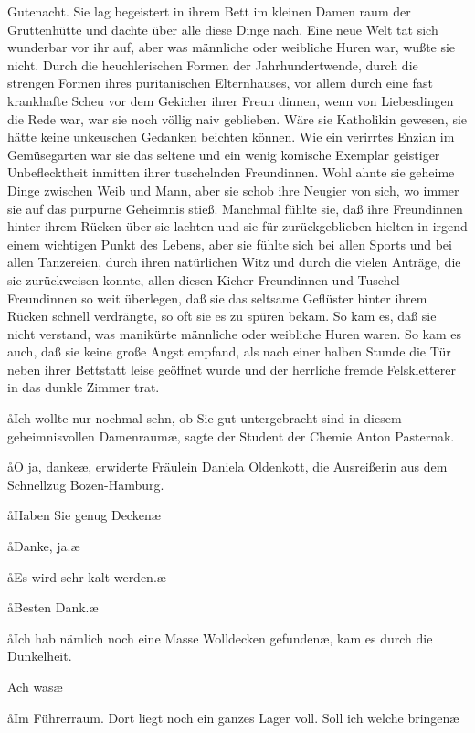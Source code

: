 Gutenacht. Sie lag begeistert in ihrem Bett im kleinen Damen\-%
raum der Gruttenhütte und dachte über alle diese Dinge nach.
Eine neue Welt tat sich wunderbar vor ihr auf, aber was
männliche oder weibliche Huren war, wußte sie nicht. Durch
die heuchlerischen Formen der Jahrhundertwende, durch die
strengen Formen ihres puritanischen Elternhauses, vor allem
durch eine fast krankhafte Scheu vor dem Gekicher ihrer Freun\-%
dinnen, wenn von Liebesdingen die Rede war, war sie noch
völlig naiv geblieben. Wäre sie Katholikin gewesen, sie hätte
keine unkeuschen Gedanken beichten können. Wie ein verirrtes
Enzian im Gemüsegarten war sie das seltene und ein wenig
komische Exemplar geistiger Unbeflecktheit inmitten ihrer
tuschelnden Freundinnen. Wohl ahnte sie geheime Dinge
zwischen Weib und Mann, aber sie schob ihre Neugier von sich,
wo immer sie auf das purpurne Geheimnis stieß. Manchmal
fühlte sie, daß ihre Freundinnen hinter ihrem Rücken über
sie lachten und sie für zurückgeblieben hielten in irgend einem
wichtigen Punkt des Lebens, aber sie fühlte sich bei allen
Sports und bei allen Tanzereien, durch ihren natürlichen
Witz und durch die vielen Anträge, die sie zurückweisen konnte,
allen diesen Kicher-Freundinnen und Tuschel-Freundinnen
so weit überlegen, daß sie das seltsame Geflüster hinter ihrem
Rücken schnell verdrängte, so oft sie es zu spüren bekam. So
kam es, daß sie nicht verstand, was manikürte männliche oder
weibliche Huren waren. So kam es auch, daß sie keine große
Angst empfand, als nach einer halben Stunde die Tür neben
ihrer Bettstatt leise geöffnet wurde und der herrliche fremde
Felskletterer in das dunkle Zimmer trat.

\aa{}Ich wollte nur nochmal sehn, ob Sie gut untergebracht sind
in diesem geheimnisvollen Damenraum\ae{}, sagte der Student
der Chemie Anton Pasternak.

\aa{}O ja, danke\ae{}, erwiderte Fräulein Daniela Oldenkott, die
Ausreißerin aus dem Schnellzug Bozen-Hamburg.

\aa{}Haben Sie genug Decken\frag{}\ae{}

\aa{}Danke, ja.\ae{}

\aa{}Es wird sehr kalt werden.\ae{}

\aa{}Besten Dank.\ae{}

\aa{}Ich hab nämlich noch eine Masse Wolldecken gefunden\ae{}, kam
es durch die Dunkelheit.

\aanah{}Ach was\frag{}\ae{}

\aa{}Im Führerraum. Dort liegt noch ein ganzes Lager voll. Soll
ich welche bringen\frag{}\ae{}

